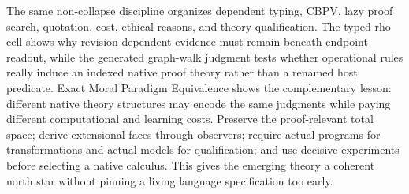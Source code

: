 \documentclass[11pt]{article}
\theoremstyle{definition}
\theoremstyle{remark}
\begin{document}
The same non-collapse discipline organizes dependent typing, CBPV, lazy proof
search, quotation, cost, ethical reasons, and theory qualification.  The typed
rho cell shows why revision-dependent evidence must remain beneath endpoint
readout, while the generated graph-walk judgment tests whether operational rules
really induce an indexed native proof theory rather than a renamed host
predicate.  Exact Moral Paradigm Equivalence shows the complementary lesson:
different native theory structures may encode the same judgments while paying
different computational and learning costs.  Preserve the proof-relevant total
space; derive extensional faces through observers; require actual programs for
transformations and actual models for qualification; and use decisive
experiments before selecting a native calculus.  This gives the emerging theory
a coherent north star without pinning a living language specification too early.
\end{document}
